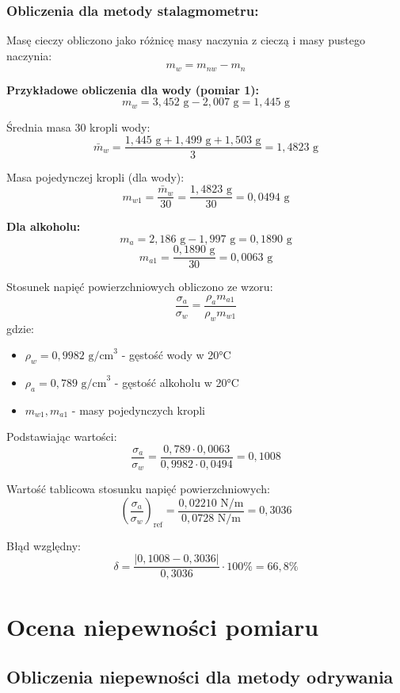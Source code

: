 \documentclass[a4paper,12pt]{article}
\begin{document}
\subsubsection{Obliczenia dla metody stalagmometru:}

Masę cieczy obliczono jako różnicę masy naczynia z cieczą i masy pustego naczynia:
$$m_w = m_{nw} - m_n$$

\noindent\textbf{Przykładowe obliczenia dla wody (pomiar 1):}
$$m_w = 3{,}452\text{ g} - 2{,}007\text{ g} = 1{,}445\text{ g}$$

Średnia masa 30 kropli wody:
$$\bar{m}_w = \frac{1{,}445\text{ g} + 1{,}499\text{ g} + 1{,}503\text{ g}}{3} = 1{,}4823\text{ g}$$

Masa pojedynczej kropli (dla wody):
$$m_{w1} = \frac{\bar{m}_w}{30} = \frac{1{,}4823\text{ g}}{30} = 0{,}0494\text{ g}$$

\noindent\textbf{Dla alkoholu:}
$$m_a = 2{,}186\text{ g} - 1{,}997\text{ g} = 0{,}1890\text{ g}$$
$$m_{a1} = \frac{0{,}1890\text{ g}}{30} = 0{,}0063\text{ g}$$

Stosunek napięć powierzchniowych obliczono ze wzoru:
$$\frac{\sigma_a}{\sigma_w} = \frac{\rho_a m_{a1}}{\rho_w m_{w1}}$$
gdzie:
\begin{itemize}
    \item $\rho_w = 0{,}9982\text{ g/cm}^3$
          - gęstość wody w 20°C
    \item $\rho_a = 0{,}789\text{ g/cm}^3$ - gęstość alkoholu w 20°C
    \item $m_{w1}, m_{a1}$ - masy pojedynczych kropli
\end{itemize}

Podstawiając wartości:
$$\frac{\sigma_a}{\sigma_w} = \frac{0,789 \cdot 0,0063}{0,9982 \cdot 0,0494} = 0,1008$$

Wartość tablicowa stosunku napięć powierzchniowych:
$$\left(\frac{\sigma_a}{\sigma_w}\right)_{\text{ref}} = \frac{0,02210\text{ N/m}}{0,0728\text{ N/m}} = 0,3036$$

Błąd względny:
$$\delta = \frac{|0,1008 - 0,3036|}{0,3036} \cdot 100\% = 66,8\%$$

\section{Ocena niepewności pomiaru}

\subsection{Obliczenia niepewności dla metody odrywania}
\end{document}
